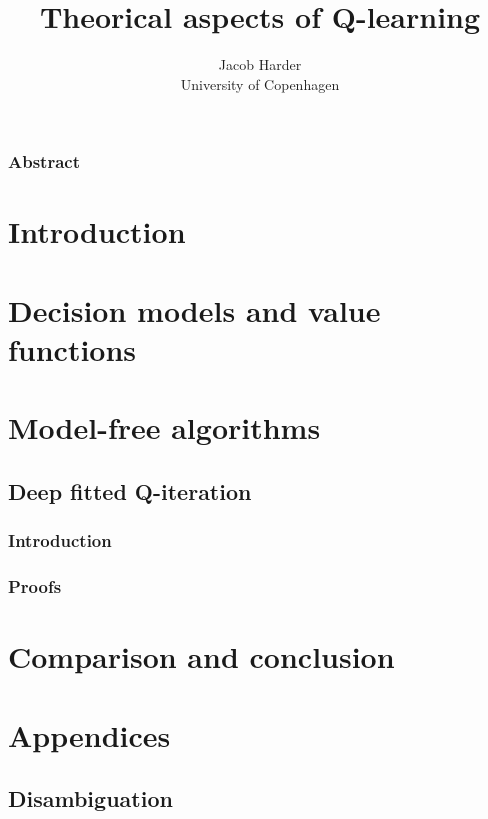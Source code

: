 \documentclass{report}
\title{Theorical aspects of Q-learning}
\author{Jacob Harder \\ University of Copenhagen}
\begin{document}


\subsection*{Abstract}


\newpage
\renewcommand{\baselinestretch}{1.0}\normalsize
\tableofcontents
\renewcommand{\baselinestretch}{1.3}\normalsize

\newpage
\chapter{Introduction}

%
\chapter{Decision models and value functions}


\chapter{Model-free algorithms}


\section{Deep fitted Q-iteration}
\subsection{Introduction}

\subsection{Proofs}


\chapter{Comparison and conclusion}

\setcounter{chapter}{0}%
\renewcommand{\thechapter}{\Alph{chapter}}%
\chapter{Appendices}

\newpage
\section{Disambiguation}

\newpage
{}
\end{document}
